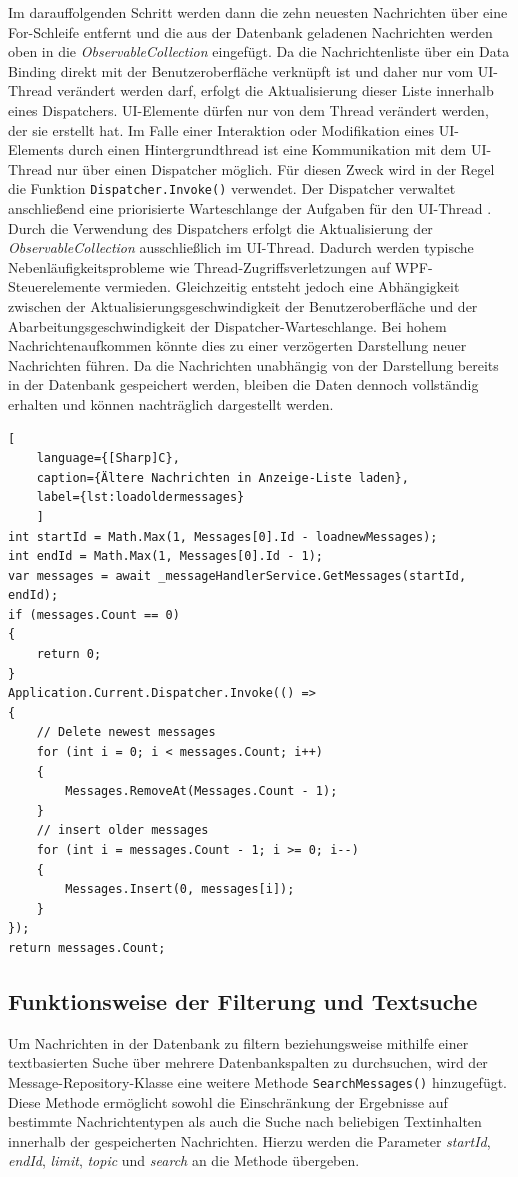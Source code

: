 Im darauffolgenden Schritt werden dann die zehn neuesten Nachrichten über eine For-Schleife entfernt und die aus der Datenbank geladenen Nachrichten werden oben in die \textit{ObservableCollection} eingefügt. Da die Nachrichtenliste über ein Data Binding direkt mit der Benutzeroberfläche verknüpft ist und daher nur vom UI-Thread verändert werden darf, erfolgt die Aktualisierung dieser Liste innerhalb eines Dispatchers. UI-Elemente dürfen nur von dem Thread verändert werden, der sie erstellt hat. Im Falle einer Interaktion oder Modifikation eines UI-Elements durch einen Hintergrundthread ist eine Kommunikation mit dem UI-Thread nur über einen Dispatcher möglich. Für diesen Zweck wird in der Regel die Funktion \lstinline|Dispatcher.Invoke()| verwendet.  Der Dispatcher verwaltet anschließend eine priorisierte Warteschlange der Aufgaben für den UI-Thread \autocite{dotnet-botDispatcherClassSystemWindowsThreading}. 
Durch die Verwendung des Dispatchers erfolgt die Aktualisierung der \textit{ObservableCollection} ausschließlich im UI-Thread. Dadurch werden typische Nebenläufigkeitsprobleme wie Thread-Zugriffsverletzungen auf WPF-Steuerelemente vermieden. Gleichzeitig entsteht jedoch eine Abhängigkeit zwischen der Aktualisierungsgeschwindigkeit der Benutzeroberfläche und der Abarbeitungsgeschwindigkeit der Dispatcher-Warteschlange. Bei hohem Nachrichtenaufkommen könnte dies zu einer verzögerten Darstellung neuer Nachrichten führen. Da die Nachrichten unabhängig von der Darstellung bereits in der Datenbank gespeichert werden, bleiben die Daten dennoch vollständig erhalten und können nachträglich dargestellt werden.
\begin{lstlisting}[
    language={[Sharp]C},
    caption={Ältere Nachrichten in Anzeige-Liste laden},
    label={lst:loadoldermessages}
    ]
int startId = Math.Max(1, Messages[0].Id - loadnewMessages);
int endId = Math.Max(1, Messages[0].Id - 1);
var messages = await _messageHandlerService.GetMessages(startId, endId);
if (messages.Count == 0)
{
    return 0;
}
Application.Current.Dispatcher.Invoke(() =>
{
    // Delete newest messages
    for (int i = 0; i < messages.Count; i++)
    {
        Messages.RemoveAt(Messages.Count - 1);
    }
    // insert older messages
    for (int i = messages.Count - 1; i >= 0; i--)
    {
        Messages.Insert(0, messages[i]);
    }
});
return messages.Count;
\end{lstlisting}
\subsection{Funktionsweise der Filterung und Textsuche}
Um Nachrichten in der Datenbank zu filtern beziehungsweise mithilfe einer textbasierten Suche über mehrere Datenbankspalten zu durchsuchen, wird der Message-Repository-Klasse eine weitere Methode \lstinline|SearchMessages()| hinzugefügt. 
Diese Methode ermöglicht sowohl die Einschränkung der Ergebnisse auf bestimmte Nachrichtentypen als auch die Suche nach beliebigen Textinhalten innerhalb der gespeicherten Nachrichten. Hierzu werden die Parameter \textit{startId}, \textit{endId}, \textit{limit}, \textit{topic} und \textit{ search} an die Methode übergeben.

